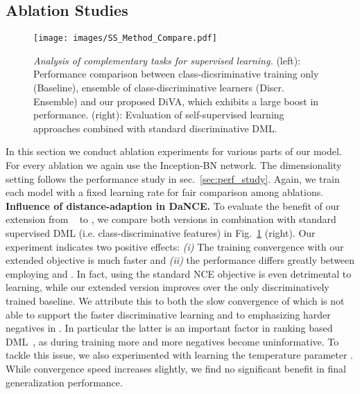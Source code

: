 \documentclass[runningheads]{llncs}
\begin{document}
\subsection{Ablation Studies}
\begin{figure}[t]
    \centering
    \texttt{[image: images/SS\_Method\_Compare.pdf]}
    \caption{\textit{Analysis of complementary tasks for supervised learning.} (left): Performance comparison between class-dicsriminative training only (Baseline), ensemble of class-discriminative learners (Discr. Ensemble) and our proposed DiVA, which exhibits a large boost in performance. (right): Evaluation of self-supervised learning approaches combined with standard discriminative DML.}
    \label{fig:abl_ss_compare}
\end{figure}
\vspace{-4pt} In this section we conduct ablation experiments for various parts of our model. For every ablation we again use the Inception-BN network. The dimensionality setting follows the performance study in sec.~\ref{sec:perf_study}. Again, we train each model with a fixed learning rate for fair comparison among ablations.
\\
\noindent
\textbf{Influence of distance-adaption in DaNCE.} To evaluate the benefit of our extension from ~\cite{moco,nce} to , we compare both versions in combination with standard supervised DML (i.e. class-discriminative features) in Fig.~\ref{fig:abl_ss_compare} (right). Our experiment indicates two positive effects: \textit{(i)} The training convergence with our extended objective is much faster and \textit{(ii)} the performance differs greatly between employing  and . In fact, using the standard NCE objective is even detrimental to learning, while our extended version improves over the only discriminatively trained baseline. We attribute this to both the slow convergence of  which is not able to support the faster discriminative learning and to emphasizing harder negatives in . In particular the latter is an important factor in ranking based DML~\cite{semihard}, as during training more and more negatives become uninformative. To tackle this issue, we also experimented with learning the temperature parameter . While convergence speed increases slightly, we find no significant benefit in final generalization performance.
\\
\noindent
\end{document}
